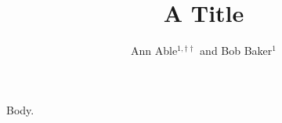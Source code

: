 \documentclass{revtex4-2}
\begin{document}
\title{A Title}
\author{Ann Able$^{1,\dagger\dagger}$ and Bob Baker$^{1}$}
\maketitle
Body.
\end{document}
